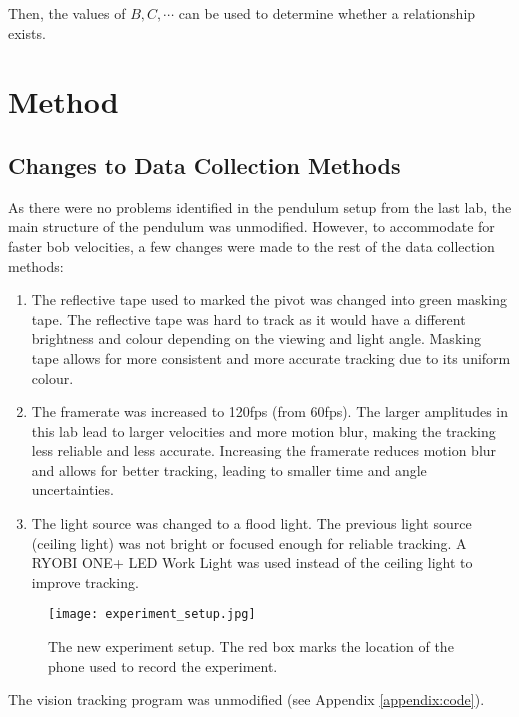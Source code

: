 \documentclass[aps,twocolumn,secnumarabic,nobalancelastpage,amsmath,amssymb,nofootinbib,floatfix]{revtex4}
\begin{document}
Then, the values of $B, C, \cdots$ can be used to determine whether a relationship exists.


\section{Method}

\subsection{Changes to Data Collection Methods}

As there were no problems identified in the pendulum setup from the last lab, the main structure of the pendulum was
unmodified. However, to accommodate for faster bob velocities, a few changes were made to the rest of the data
collection methods:

\begin{enumerate}
    \item The reflective tape used to marked the pivot was changed into green masking tape. The reflective tape was
          hard to track as it would have a different brightness and colour depending on the viewing and light angle.
          Masking tape allows for more consistent and more accurate tracking due to its uniform colour.
    \item The framerate was increased to 120fps (from 60fps). The larger amplitudes in this lab lead to larger
          velocities and more motion blur, making the tracking less reliable and less accurate. Increasing the framerate
          reduces motion blur and allows for better tracking, leading to smaller time and angle uncertainties.
    \item The light source was changed to a flood light. The previous light source (ceiling light) was not bright or
          focused enough for reliable tracking. A RYOBI ONE+ LED Work Light was used instead of the ceiling light to
          improve tracking.
\end{enumerate}

\begin{figure}[htb]
    \texttt{[image: experiment\_setup.jpg]}
    \caption{The new experiment setup. The red box marks the location of the phone used to record the experiment.}
\end{figure}

The vision tracking program was unmodified (see Appendix \ref{appendix:code}).
\end{document}
